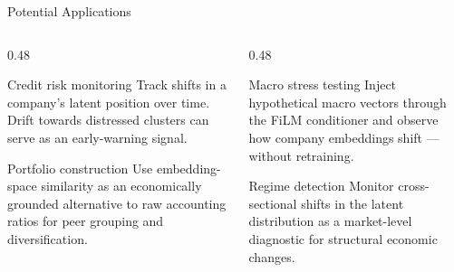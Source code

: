 \documentclass[aspectratio=169]{beamer}
\begin{document}
\begin{frame}{Potential Applications}

  \begin{columns}[T]
    \begin{column}{0.48\textwidth}
      \begin{block}{Credit risk monitoring}
        Track shifts in a company's latent position over time.
        Drift towards distressed clusters can serve as an early-warning signal.
      \end{block}
      \vspace{0.5em}
      \begin{block}{Portfolio construction}
        Use embedding-space similarity as an economically grounded alternative
        to raw accounting ratios for peer grouping and diversification.
      \end{block}
    \end{column}
    \begin{column}{0.48\textwidth}
      \begin{block}{Macro stress testing}
        Inject hypothetical macro vectors through the FiLM conditioner and
        observe how company embeddings shift — without retraining.
      \end{block}
      \vspace{0.5em}
      \begin{block}{Regime detection}
        Monitor cross-sectional shifts in the latent distribution as a
        market-level diagnostic for structural economic changes.
      \end{block}
    \end{column}
  \end{columns}

\end{frame}
\end{document}
